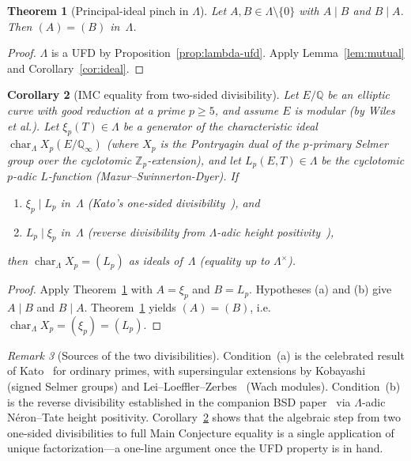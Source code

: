 \documentclass[11pt]{amsart}
\newtheorem{theorem}{Theorem}[section]
\newtheorem{corollary}[theorem]{Corollary}
\theoremstyle{definition}
\theoremstyle{remark}
\newtheorem{remark}[theorem]{Remark}
\newcommand{\Q}{\mathbb{Q}}
\newcommand{\Z}{\mathbb{Z}}
\newcommand{\Lam}{\Lambda}
\DeclareMathOperator{\chr}{char}
\begin{document}
\begin{theorem}[Principal-ideal pinch in $\Lam$]\label{thm:pinch-lambda}
Let $A,B\in\Lam\setminus\{0\}$ with $A\mid B$ and $B\mid A$.
Then $(A)=(B)$ in~$\Lam$.
\end{theorem}
\begin{proof}
$\Lam$ is a UFD by Proposition~\ref{prop:lambda-ufd}.
Apply Lemma~\ref{lem:mutual} and Corollary~\ref{cor:ideal}.
\end{proof}

\begin{corollary}[IMC equality from two-sided divisibility]\label{cor:imc}
Let $E/\Q$ be an elliptic curve with good reduction at a prime $p\ge5$,
and assume $E$ is modular (by Wiles et al.).
Let $\xi_p(T)\in\Lam$ be a generator of the characteristic ideal
$\chr_\Lam X_p(E/\Q_\infty)$ (where $X_p$ is the Pontryagin dual of
the $p$-primary Selmer group over the cyclotomic $\Z_p$-extension),
and let $L_p(E,T)\in\Lam$ be the cyclotomic $p$-adic $L$-function
(Mazur--Swinnerton-Dyer).
If
\begin{enumerate}[label=\textup{(\alph*)},nosep]
\item $\xi_p\mid L_p$ in~$\Lam$
  \textup{(}Kato's one-sided divisibility~\cite{Kato}\textup{)}, and
\item $L_p\mid\xi_p$ in~$\Lam$
  \textup{(}reverse divisibility from $\Lam$-adic height
  positivity~\cite{BSD}\textup{)},
\end{enumerate}
then $\chr_\Lam X_p=(L_p)$ as ideals of~$\Lam$ (equality up to
$\Lam^\times$).
\end{corollary}
\begin{proof}
Apply Theorem~\ref{thm:pinch-lambda} with $A=\xi_p$ and $B=L_p$.
Hypotheses (a) and (b) give $A\mid B$ and $B\mid A$.
Theorem~\ref{thm:pinch-lambda} yields $(A)=(B)$, i.e.\
$\chr_\Lam X_p=(\xi_p)=(L_p)$.
\end{proof}

\begin{remark}[Sources of the two divisibilities]\label{rem:sources}
Condition~(a) is the celebrated result of Kato~\cite{Kato} for
ordinary primes, with supersingular extensions by
Kobayashi~\cite{Kob} (signed Selmer groups) and
Lei--Loeffler--Zerbes~\cite{LLZ} (Wach modules).
Condition~(b) is the reverse divisibility established in the companion
BSD paper~\cite{BSD} via $\Lam$-adic N\'eron--Tate height positivity.
Corollary~\ref{cor:imc} shows that the algebraic step from two
one-sided divisibilities to full Main Conjecture equality is a single
application of unique factorization---a one-line argument once the
UFD property is in hand.
\end{remark}
\end{document}
